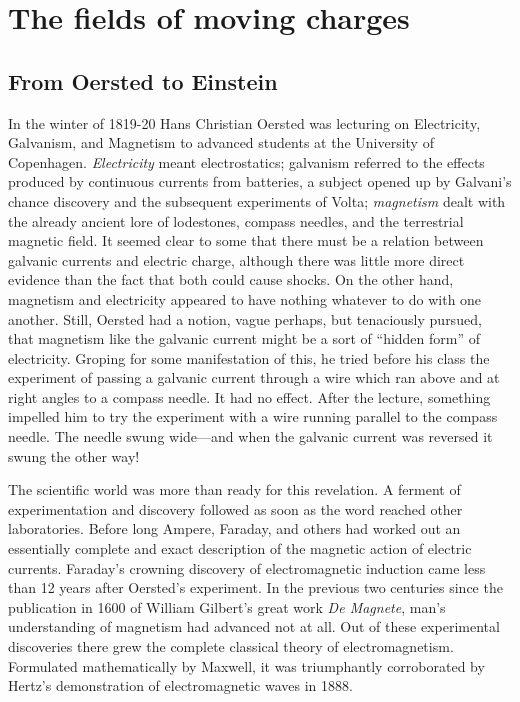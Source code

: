 \chapter{The fields of moving charges}

\section{From Oersted to Einstein}

In the winter of 1819-20 Hans Christian Oersted was lecturing on
Electricity, Galvanism, and Magnetism to advanced students at the
University of Copenhagen. \emph{Electricity} meant electrostatics; galvanism
referred to the effects produced by continuous currents from
batteries, a subject opened up by Galvani's chance discovery and the
subsequent experiments of Volta; \emph{magnetism} dealt with the already
ancient lore of lodestones, compass needles, and the terrestrial magnetic
field. It seemed clear to some that there must be a relation between
galvanic currents and electric charge, although there was little
more direct evidence than the fact that both could cause shocks. On
the other hand, magnetism and electricity appeared to have nothing
whatever to do with one another. Still, Oersted had a notion, vague
perhaps, but tenaciously pursued, that magnetism like the galvanic
current might be a sort of ``hidden form'' of electricity. Groping for
some manifestation of this, he tried before his class the experiment
of passing a galvanic current through a wire which ran above and at
right angles to a compass needle. It had no effect. After the lecture,
something impelled him to try the experiment with a wire running
parallel to the compass needle. The needle swung wide---and when
the galvanic current was reversed it swung the other way!

The scientific world was more than ready for this revelation. A
ferment of experimentation and discovery followed as soon as the
word reached other laboratories. Before long Ampere, Faraday, and
others had worked out an essentially complete and exact description
of the magnetic action of electric currents. Faraday's crowning discovery
of electromagnetic induction came less than 12 years after
Oersted's experiment. In the previous two centuries since the publication
in 1600 of William Gilbert's great work \emph{De Magnete}, man's
understanding of magnetism had advanced not at all. Out of these
experimental discoveries there grew the complete classical theory of
electromagnetism. Formulated mathematically by Maxwell, it was
triumphantly corroborated by Hertz's demonstration of electromagnetic
waves in 1888.


